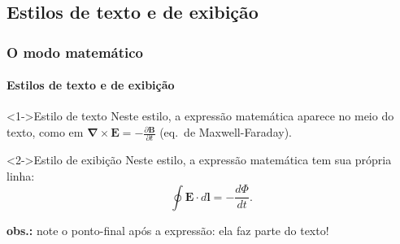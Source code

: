 \documentclass[handout,10pt]{beamer}
\begin{document}
\subsection{Estilos de texto e de exibição}
\begin{frame}[fragile]
	\frametitle{O modo matemático}
	\framesubtitle{Estilos de texto e de exibição}

	\begin{block}<1->{Estilo de texto \hfill {}}		
		Neste estilo, a expressão matemática aparece no meio do texto, como em \(\boldsymbol{\nabla}\times \boldsymbol{E} =
		- \frac{\partial\boldsymbol{B}}{\partial t}\) (eq.~de Maxwell-Faraday).	
	\end{block}\vfill

	\begin{block}<2->{Estilo de exibição \hfill {}}
	Neste estilo, a expressão matemática tem sua própria linha: \[\oint{\boldsymbol{E}
	\cdot d\boldsymbol{l}} = -\frac{d\Phi}{dt}.\]
	
	\footnotesize\textbf{obs.:} note o ponto-final após a expressão: ela faz parte do texto!
	\end{block}\vfill


\end{frame}
\end{document}
